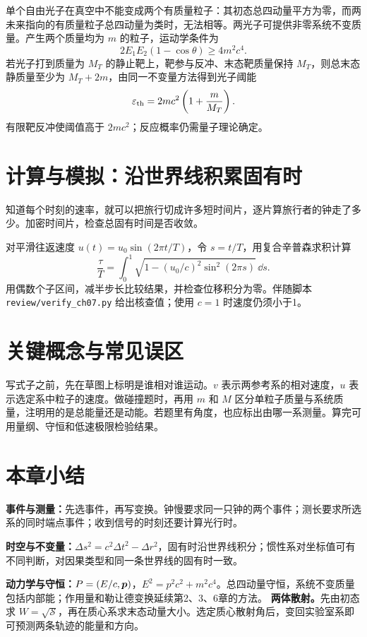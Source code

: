 \begin{modernbox}[title={进一步探索：光子产生粒子对为什么需要第二个物体？}]
单个自由光子在真空中不能变成两个有质量粒子：其初态总四动量平方为零，而两未来指向的有质量粒子总四动量为类时，无法相等。两光子可提供非零系统不变质量。产生两个质量均为 $m$ 的粒子，运动学条件为
\[
2E_1E_2(1-\cos\theta)\ge4m^2c^4.
\]
若光子打到质量为 $M_T$ 的静止靶上，靶参与反冲、末态靶质量保持 $M_T$，则总末态静质量至少为 $M_T+2m$，由同一不变量方法得到光子阈能
\[
\varepsilon_{\rm th}=2mc^2\left(1+\frac{m}{M_T}\right).
\]
有限靶反冲使阈值高于 $2mc^2$；反应概率仍需量子理论确定。
\end{modernbox}

\section{计算与模拟：沿世界线积累固有时}
知道每个时刻的速率，就可以把旅行切成许多短时间片，逐片算旅行者的钟走了多少。加密时间片，检查总固有时间是否收敛。

对平滑往返速度 $u(t)=u_0\sin(2\pi t/T)$，令 $s=t/T$，用复合辛普森求积计算
\[
\frac{\tau}{T}=\int_0^1\sqrt{1-(u_0/c)^2\sin^2(2\pi s)}\,\dd s.
\]
用偶数个子区间，减半步长比较结果，并检查位移积分为零。伴随脚本 \texttt{review/verify\_ch07.py} 给出核查值；使用 $c=1$ 时速度仍须小于1。

\section*{关键概念与常见误区}

写式子之前，先在草图上标明是谁相对谁运动。$v$ 表示两参考系的相对速度，$u$ 表示选定系中粒子的速度。做碰撞题时，再用 $m$ 和 $M$ 区分单粒子质量与系统质量，注明用的是总能量还是动能。若题里有角度，也应标出由哪一系测量。算完可用量纲、守恒和低速极限检验结果。

\section*{本章小结}
\begin{keybox}
\textbf{事件与测量：}先选事件，再写变换。钟慢要求同一只钟的两个事件；测长要求所选系的同时端点事件；收到信号的时刻还要计算光行时。

\textbf{时空与不变量：}$\Delta s^2=c^2\Delta t^2-\Delta r^2$，固有时沿世界线积分；惯性系对坐标值可有不同判断，对因果类型和同一条世界线的固有时一致。

\textbf{动力学与守恒：}$P=(E/c,\boldsymbol{p})$，$E^2=p^2c^2+m^2c^4$。总四动量守恒，系统不变质量包括内部能；作用量和勒让德变换延续第2、3、6章的方法。
\textbf{两体散射。}先由初态求 $W=\sqrt{\mathcal S}$，再在质心系求末态动量大小。选定质心散射角后，变回实验室系即可预测两条轨迹的能量和方向。
\end{keybox}

